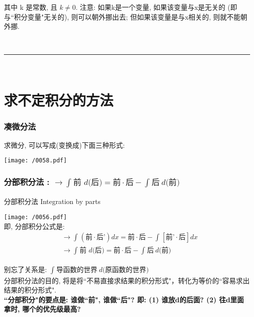 \documentclass[UTF8]{ctexart}
\begin{document}
	其中 k 是常数, 且 $ k \ne 0$. 注意: 如果k是一个变量, 如果该变量与x是无关的 (即与``积分变量"无关的), 则可以朝外挪出去; 但如果该变量是与x相关的, 则就不能朝外挪.
	
	
	
	~\\
	\hrule
	~\\
	
	
	\part{求不定积分的方法}
	
	
	
	\section{凑微分法}
	
	求微分, 可以写成(变换成)下面三种形式:	
	 
	 \texttt{[image: /0058.pdf]}
	 
	
	
	
	
	\section{分部积分法 : $\rightarrow \int_{}^{}{\text{前\ }d\text{(后)}}=\text{前}\cdot \text{后}-\int_{}^{}{\text{后}}\ d\text{(前)}$}
	
	分部积分法 Integration by parts
	
	\texttt{[image: /0056.pdf]} \\
	
	即, 分部积分公式是:	
	\begin{align*}  %
		&\rightarrow \int_{}^{}{\left( \text{前}\cdot \text{后'} \right) dx}=\text{前}\cdot \text{后}-\int_{}^{}{\left[ \text{前'}\cdot \text{后} \right]}dx\\
		&\rightarrow \int_{}^{}{\text{前\ }d\text{(后)}}=\text{前}\cdot \text{后}-\int_{}^{}{\text{后}}\ d\text{(前)} 
\end{align*}
	
	别忘了关系是: $ \boxed{\int_{}^{}{\text{导函数的世界}}\ d\text{(原函数的世界)}}$ \\
	
	分部积分法的目的, 将是将``不易直接求结果的积分形式"，转化为等价的``容易求出结果的积分形式". \\
	
	
	\textbf{``分部积分"的要点是: 谁做``前", 谁做``后"? 即: (1) 谁放d的后面?  (2) 往d里面拿时, 哪个的优先级最高?}
	
\end{document}
